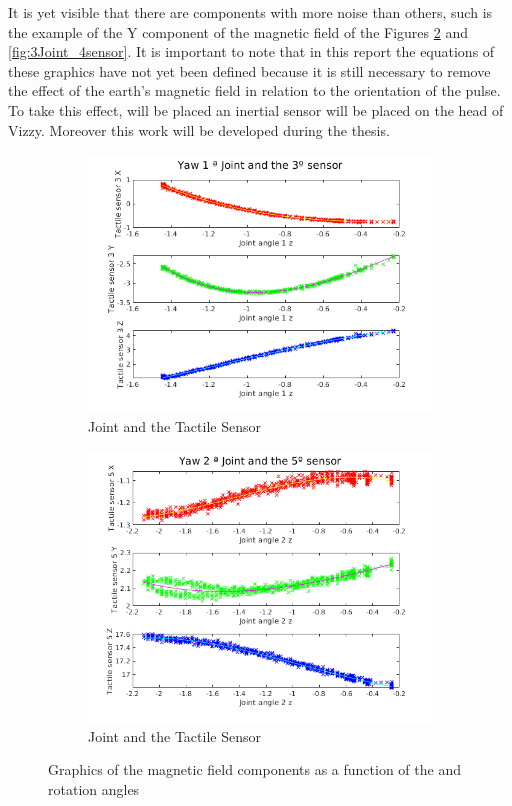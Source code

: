 It is yet visible that there are components with more noise than others, such is the example of the Y component of the magnetic field of the Figures \ref{fig:2Joint_5sensor} and \ref{fig:3Joint_4sensor}.
It is important to note that in this report the equations of these graphics have not yet been defined because it is still necessary to remove the effect of the earth's magnetic field in relation to the orientation of the pulse.
To take this effect, will be placed an inertial sensor will be placed on the head of Vizzy. Moreover this work will be developed during the thesis.
\begin{figure}
\centering
\begin{subfigure}{.5\textwidth}
  \centering
  \includegraphics[width=1\linewidth]{images/1Joint_3sensor.png}
  \caption{ Joint and the  Tactile Sensor}
  \label{fig:fig:1Joint_3sensor}
\end{subfigure}%
\begin{subfigure}{.5\textwidth}
  \centering
  \includegraphics[width=1\linewidth]{images/2Joint_5sensor.png}
  \caption{ Joint and the  Tactile Sensor}
  \label{fig:2Joint_5sensor}
\end{subfigure}
\caption{Graphics of the magnetic field components as a function of the  and  rotation angles }
\label{fig:1and2Joint}
\end{figure}

